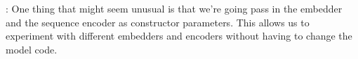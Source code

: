 \begin{itemizeSpaced}{3pt}
    \item {}: One thing that might seem unusual is that we're going pass in the embedder and the sequence encoder as constructor parameters. This allows us to experiment with different embedders and encoders without having to change the model code. 
% 
% 


\end{itemizeSpaced}


